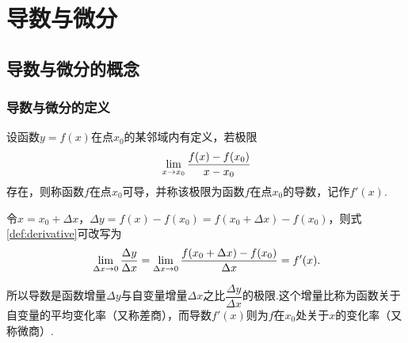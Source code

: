 \chapter{导数与微分}
\section{导数与微分的概念}
\subsection{导数与微分的定义}
\begin{definition}[导数]
	设函数$y=f(x)$在点$x_0$的某邻域内有定义，若极限
	\begin{equation}{\label{def:derivative}}
		\lim\limits_{x\to x_0}\frac{f(x)-f(x_0)}{x-x_0}
	\end{equation}
	存在，则称函数$f${\heiti 在点$x_0$可导}，并称该极限为函数$f${\heiti 在点$x_0$的导数}，记作$f'(x)$.
\end{definition}
令$x=x_0+\Delta x$，$\Delta y=f(x)-f(x_0)=f(x_0+\Delta x)-f(x_0)$，则式\ref{def:derivative}可改写为
\begin{equation}{\label{def':derivative}}
	\lim\limits_{\Delta x\to 0}\frac{\Delta y}{\Delta x}=\lim\limits_{\Delta x\to 0}\frac{f(x_0+\Delta x)-f(x_0)}{\Delta x}=f'(x).
\end{equation}

所以导数是函数增量$\Delta y$与自变量增量$\Delta x$之比$\dfrac{\Delta y}{\Delta x}$的极限.这个增量比称为函数关于自变量的平均变化率（又称{\heiti 差商}），而导数$f'(x)$则为$f$在$x_0$处关于$x$的变化率（又称{\heiti 微商}）.

